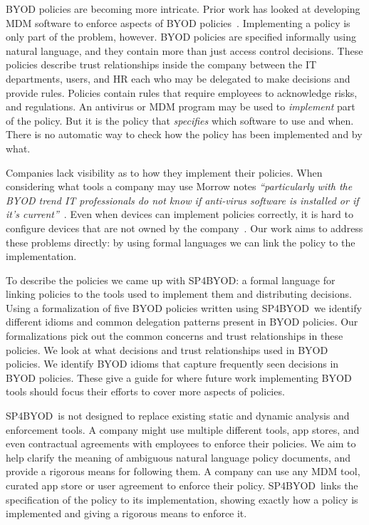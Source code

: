 \documentclass{llncs}
\newcommand{\AppPAL}[0]{SP4BYOD}
\begin{document}
BYOD policies are becoming more intricate.
Prior work has looked at developing \ac{MDM} software to enforce aspects of BYOD policies~\cite{costantino_towards_2013,martinelli_enhancing_2016,armando_enabling_2014}.
Implementing a policy is only part of the problem, however.
BYOD policies are specified informally using natural language, and they contain more than just access control decisions.
These policies describe trust relationships inside the company between the IT departments, users, and HR each who may be delegated to make decisions and provide rules.
Policies contain rules that require employees to acknowledge risks, and regulations.
An antivirus or \ac{MDM} program may be used to \emph{implement} part of the policy.
But it is the policy that \emph{specifies} which software to use and when. 
There is no automatic way to check how the policy has been implemented and by what.

Companies lack visibility as to how they implement their policies.
When considering what tools a company may use Morrow notes \emph{``particularly with the BYOD trend IT professionals do not know if anti-virus software is installed or if it's current''}~\cite{morrow_byod_2012}.
Even when devices can implement policies correctly, it is hard to configure devices that are not owned by the company~\cite{tokuyoshi_security_2013}.
Our work aims to address these problems directly: by using formal languages we can link the policy to the implementation.

To describe the policies we came up with \AppPAL{}: 
  a formal language for linking policies to the tools used to implement them and distributing decisions.
Using a formalization of five BYOD policies written using \AppPAL~we identify different idioms and common delegation patterns present in BYOD policies.
Our formalizations pick out the common concerns and trust relationships in these policies.
We look at what decisions and trust relationships used in BYOD policies.
We identify BYOD idioms that capture frequently seen decisions in BYOD policies.
These give a guide for where future work implementing BYOD tools should focus their efforts to cover more aspects of policies.

\AppPAL~is not designed to replace existing static and dynamic analysis and enforcement tools.
A company might use multiple different tools, app stores, and even contractual agreements with employees to enforce their policies.
We aim to help clarify the meaning of ambiguous natural language policy documents, and provide a rigorous means for following them.
A company can use any \ac{MDM} tool, curated app store or user agreement to enforce their policy.
\AppPAL~links the specification of the policy to its implementation, showing exactly how a policy is implemented and giving a rigorous means to enforce it.
\end{document}
